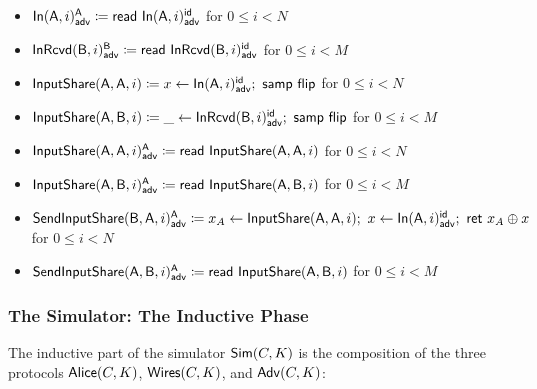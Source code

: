 \begin{itemize}
\item {\color{blue} $\LeakIn(\A,i)^\A_\adv \coloneqq \read{\LeakIn(\A,i)^\id_\adv}$ for $0 \leq i < N$}
\item {\color{blue} $\LeakInRcvd(\B,i)^\B_\adv \coloneqq \read{\LeakInRcvd(\B,i)^\id_\adv}$ for $0 \leq i < M$}\smallskip
\item $\InputShare(\A,\A,i) \coloneqq x \leftarrow \LeakIn(\A,i)^\id_\adv; \ \samp{\flip}$ for $0 \leq i < N$
\item $\InputShare(\A,\B,i) \coloneqq \_ \leftarrow \LeakInRcvd(\B,i)^\id_\adv; \ \samp{\flip}$ for $0 \leq i < M$\smallskip
\item {\color{blue} $\LeakInputShare(\A,\A,i)^\A_\adv \coloneqq \read{\InputShare(\A,\A,i)}$ for $0 \leq i < N$}
\item {\color{blue} $\LeakInputShare(\A,\B,i)^\A_\adv \coloneqq \read{\InputShare(\A,\B,i)}$ for $0 \leq i < M$}\smallskip
\item {\color{blue} $\LeakSendInputShare(\B,\A,i)^\A_\adv \coloneqq x_A \leftarrow \InputShare(\A,\A,i); \ x \leftarrow \LeakIn(\A,i)^\id_\adv; \ \ret{x_A \oplus x}$ for $0 \leq i < N$}
\item {\color{blue} $\LeakSendInputShare(\A,\B,i)^\A_\adv \coloneqq \read{\InputShare(\A,\B,i)}$ for $0 \leq i < M$}
\end{itemize}

\subsubsection{The Simulator: The Inductive Phase}
The inductive part of the simulator $\Sim(C,K)$ is the composition of the three protocols $\Alice(C,K)$, $\Wires(C,K)$, and $\Adv(C,K)$:

